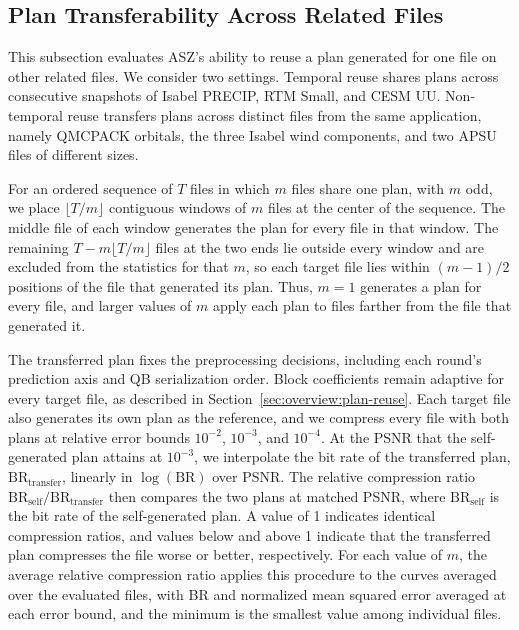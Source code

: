 \subsection{Plan Transferability Across Related Files}
\label{sec:evaluation:transfer}

This subsection evaluates ASZ's ability to reuse a plan generated for one file on other related files. We consider two settings. Temporal reuse shares plans across consecutive snapshots of Isabel PRECIP, RTM Small, and CESM UU. Non-temporal reuse transfers plans across distinct files from the same application, namely QMCPACK orbitals, the three Isabel wind components, and two APSU files of different sizes.

For an ordered sequence of $T$ files in which $m$ files share one plan, with $m$ odd, we place $\lfloor T/m\rfloor$ contiguous windows of $m$ files at the center of the sequence. The middle file of each window generates the plan for every file in that window. The remaining $T-m\lfloor T/m\rfloor$ files at the two ends lie outside every window and are excluded from the statistics for that $m$, so each target file lies within $(m-1)/2$ positions of the file that generated its plan. Thus, $m=1$ generates a plan for every file, and larger values of $m$ apply each plan to files farther from the file that generated it.

The transferred plan fixes the preprocessing decisions, including each round's prediction axis and QB serialization order. Block coefficients remain adaptive for every target file, as described in Section~\ref{sec:overview:plan-reuse}. Each target file also generates its own plan as the reference, and we compress every file with both plans at relative error bounds $10^{-2}$, $10^{-3}$, and $10^{-4}$. At the PSNR that the self-generated plan attains at $10^{-3}$, we interpolate the bit rate of the transferred plan, $\mathrm{BR}_{\mathrm{transfer}}$, linearly in $\log(\mathrm{BR})$ over PSNR. The relative compression ratio $\mathrm{BR}_{\mathrm{self}}/\mathrm{BR}_{\mathrm{transfer}}$ then compares the two plans at matched PSNR, where $\mathrm{BR}_{\mathrm{self}}$ is the bit rate of the self-generated plan. A value of 1 indicates identical compression ratios, and values below and above 1 indicate that the transferred plan compresses the file worse or better, respectively. For each value of $m$, the average relative compression ratio applies this procedure to the curves averaged over the evaluated files, with BR and normalized mean squared error averaged at each error bound, and the minimum is the smallest value among individual files.

